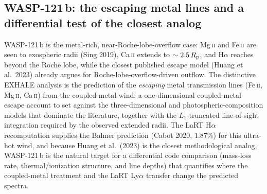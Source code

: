 \subsection{WASP-121\,b: the escaping metal lines and a differential test of the closest analog}
WASP-121\,b is the metal-rich, near-Roche-lobe-overflow case: Mg\,\textsc{ii} and
Fe\,\textsc{ii} are seen to exospheric radii (Sing 2019), Ca\,\textsc{ii} extends
to $\sim2.5\,R_{\rm p}$, and H$\alpha$ reaches beyond the Roche lobe, while the
closest published escape model (Huang et al.\ 2023) already argues for
Roche-lobe-overflow-driven outflow. The distinctive EXHALE analysis is the
prediction of the \emph{escaping} metal transmission lines (Fe\,\textsc{ii},
Mg\,\textsc{ii}, Ca\,\textsc{ii}) from the coupled-metal wind: a
one-dimensional coupled-metal escape account to set against the three-dimensional
and photospheric-composition models that dominate the literature, together with
the $L_1$-truncated line-of-sight integration required by the observed extended
radii. The LaRT H$\alpha$ recomputation supplies the Balmer prediction (Cabot 2020,
$1.87\%$) for this ultra-hot wind, and because Huang et al.\ (2023) is the closest
methodological analog, WASP-121\,b is the natural target for a differential
code comparison (mass-loss rate, thermal/ionization structure, and line depths)
that quantifies where the coupled-metal treatment and the LaRT Ly$\alpha$ transfer
change the predicted spectra.

